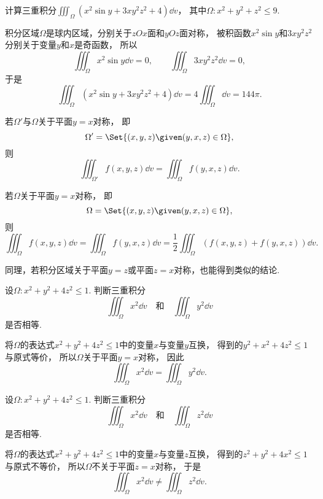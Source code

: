 \begin{example}
计算三重积分\(\iiint_\Omega (x^2 \sin y + 3xy^2z^2 + 4) \dd{v}\)，
其中\(\Omega: x^2+y^2+z^2\leq9\).
\begin{solution}
积分区域\(\Omega\)是球内区域，分别关于\(zOx\)面和\(yOz\)面对称，
被积函数\(x^2 \sin y\)和\(3xy^2z^2\)分别关于变量\(y\)和\(x\)是奇函数，
所以\[
	\iiint_\Omega x^2 \sin y \dd{v} = 0,
	\qquad
	\iiint_\Omega 3xy^2z^2 \dd{v} = 0,
\]
于是\[
	\iiint_\Omega (x^2 \sin y + 3xy^2z^2 + 4) \dd{v}
	= 4 \iiint_\Omega \dd{v}
	= 144 \pi.
\]
\end{solution}
\end{example}

若\(\Omega'\)与\(\Omega\)关于平面\(y=x\)对称，
即\[
	\Omega' = \Set{ (x,y,z) \given (y,x,z) \in \Omega },
\]
则\[
	\iiint_{\Omega'} f(x,y,z) \dd{v}
	= \iiint_\Omega f(y,x,z) \dd{v}.
\]

若\(\Omega\)关于平面\(y=x\)对称，
即\[
	\Omega = \Set{ (x,y,z) \given (y,x,z) \in \Omega },
\]
则\[
	\iiint_\Omega f(x,y,z) \dd{v}
	= \iiint_\Omega f(y,x,z) \dd{v}
	= \frac12 \iiint_\Omega (f(x,y,z) + f(y,x,z)) \dd{v}.
\]

同理，若积分区域关于平面\(y=z\)或平面\(z=x\)对称，也能得到类似的结论.

\begin{example}
设\(\Omega: x^2+y^2+4z^2\leq1\).
判断三重积分\[
	\iiint_\Omega x^2 \dd{v}
	\quad\text{和}\quad
	\iiint_\Omega y^2 \dd{v}
\]是否相等.
\begin{solution}
将\(\Omega\)的表达式\(x^2+y^2+4z^2\leq1\)中的变量\(x\)与变量\(y\)互换，
得到的\(y^2+x^2+4z^2\leq1\)与原式等价，
所以\(\Omega\)关于平面\(y=x\)对称，
因此\[
	\iiint_\Omega x^2 \dd{v}
	= \iiint_\Omega y^2 \dd{v}.
\]
\end{solution}
\end{example}

\begin{example}
设\(\Omega: x^2+y^2+4z^2\leq1\).
判断三重积分\[
	\iiint_\Omega x^2 \dd{v}
	\quad\text{和}\quad
	\iiint_\Omega z^2 \dd{v}
\]是否相等.
\begin{solution}
将\(\Omega\)的表达式\(x^2+y^2+4z^2\leq1\)中的变量\(x\)与变量\(z\)互换，
得到的\(z^2+y^2+4x^2\leq1\)与原式不等价，
所以\(\Omega\)不关于平面\(z=x\)对称，
于是\[
	\iiint_\Omega x^2 \dd{v}
	\neq \iiint_\Omega z^2 \dd{v}.
\]
\end{solution}
\end{example}
